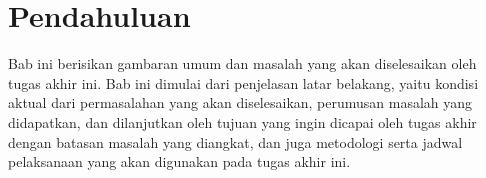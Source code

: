 \chapter{Pendahuluan}


Bab ini berisikan gambaran umum dan masalah yang akan diselesaikan oleh tugas akhir ini. Bab ini dimulai dari penjelasan latar belakang, yaitu kondisi aktual dari permasalahan yang akan diselesaikan, perumusan masalah yang didapatkan, dan dilanjutkan oleh tujuan yang ingin dicapai oleh tugas akhir dengan batasan masalah yang diangkat, dan juga metodologi serta jadwal pelaksanaan yang akan digunakan pada tugas akhir ini. 


\pagebreak







